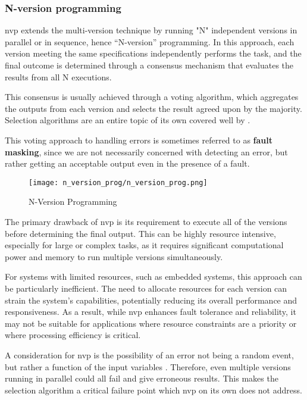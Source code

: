 \subsubsection{N-version programming}

\Acrfull{nvp} \cite{aa:nvp} extends the multi-version technique by running "N" independent versions in parallel or in sequence, hence “N-version” programming. In this approach, each version meeting the same specifications independently performs the task, and the final outcome is determined through a consensus mechanism that evaluates the results from all N executions.

This consensus is usually achieved through a voting algorithm, which aggregates the outputs from each version and selects the result agreed upon by the majority. Selection algorithms are an entire topic of its own covered well by \cite{Aljarbouh_2021}.

This voting approach to handling errors is sometimes referred to as \textbf{fault masking}, since we are not necessarily concerned with detecting an error, but rather getting an acceptable output even in the presence of a fault.

\begin{figure}[hbt!]
    \centering
    \texttt{[image: n\_version\_prog/n\_version\_prog.png]}
    \caption{N-Version Programming}
\end{figure}

The primary drawback of \acrshort{nvp} is its requirement to execute all of the versions before determining the final output. This can be highly resource intensive, especially for large or complex tasks, as it requires significant computational power and memory to run multiple versions simultaneously.

For systems with limited resources, such as embedded systems, this approach can be particularly inefficient. The need to allocate resources for each version can strain the system's capabilities, potentially reducing its overall performance and responsiveness. As a result, while \acrshort{nvp} enhances fault tolerance and reliability, it may not be suitable for applications where resource constraints are a priority or where processing efficiency is critical.

A consideration for \acrshort{nvp} is the possibility of an error not being a random event, but rather a function of the input variables \cite{5326}. Therefore, even multiple versions running in parallel could all fail and give erroneous results. This makes the selection algorithm a critical failure point which \acrshort{nvp} on its own does not address.

